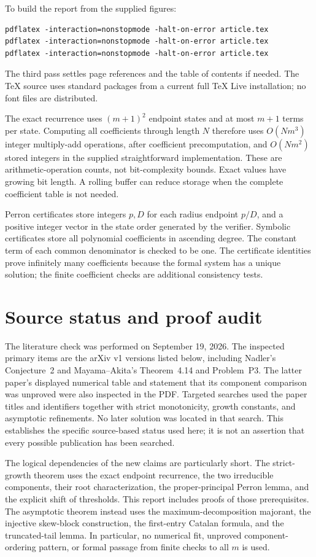 \documentclass[11pt,a4paper]{article}
\theoremstyle{definition}\newaliascnt{definition}{theorem}
\theoremstyle{remark}\newaliascnt{remark}{theorem}
\begin{document}
To build the report from the supplied figures:
\begin{lstlisting}
pdflatex -interaction=nonstopmode -halt-on-error article.tex
pdflatex -interaction=nonstopmode -halt-on-error article.tex
pdflatex -interaction=nonstopmode -halt-on-error article.tex
\end{lstlisting}
The third pass settles page references and the table of contents if needed.
The TeX source uses standard packages from a current full TeX Live
installation; no font files are distributed.

The exact recurrence uses $(m+1)^2$ endpoint states and at most $m+1$
terms per state. Computing all coefficients through length $N$ therefore
uses $O(Nm^3)$ integer multiply-add operations, after coefficient
precomputation, and $O(Nm^2)$ stored integers in the supplied straightforward
implementation. These are arithmetic-operation counts, not bit-complexity
bounds. Exact values have growing bit length. A rolling buffer can reduce
storage when the complete coefficient table is not needed.

Perron certificates store integers $p,D$ for each radius endpoint $p/D$,
and a positive integer vector in the state order generated by the verifier.
Symbolic certificates store all polynomial coefficients in ascending degree.
The constant term of each common denominator is checked to be one.
The certificate identities prove infinitely many coefficients because the
formal system has a unique solution; the finite coefficient checks are
additional consistency tests.

\section{Source status and proof audit}
\label{app:status}
The literature check was performed on September 19, 2026. The inspected
primary items are the arXiv v1 versions listed below, including Nadler's
Conjecture~2 and Mayama--Akita's Theorem~4.14 and Problem~P3. The latter
paper's displayed numerical table and statement that its component comparison
was unproved were also inspected in the PDF. Targeted searches used the
paper titles and identifiers together with strict monotonicity, growth
constants, and asymptotic refinements. No later solution was located in
that search. This establishes the specific source-based status used here;
it is not an assertion that every possible publication has been searched.

The logical dependencies of the new claims are particularly short.
The strict-growth theorem uses the exact endpoint recurrence, the two
irreducible components, their root characterization, the proper-principal
Perron lemma, and the explicit shift of thresholds. This report includes
proofs of those prerequisites. The asymptotic theorem instead uses the
maximum-decomposition majorant, the injective skew-block construction,
the first-entry Catalan formula, and the truncated-tail lemma. In particular,
no numerical fit, unproved component-ordering pattern, or formal passage
from finite checks to all $m$ is used.
\end{document}
